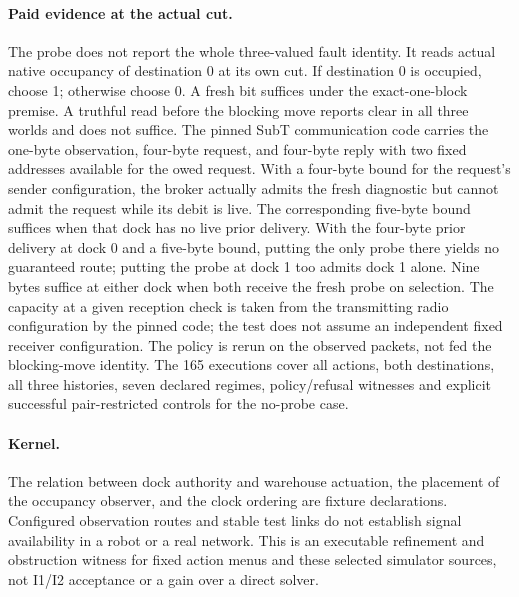 \documentclass{article}
\begin{document}
\paragraph{Paid evidence at the actual cut.}
The probe does not report the whole three-valued fault identity.
It reads actual native occupancy of destination 0 at its own cut.
If destination 0 is occupied, choose 1; otherwise choose 0.
A fresh bit suffices under the exact-one-block premise. A truthful
read before the blocking move reports clear in all three worlds
and does not suffice. The pinned SubT communication code carries
the one-byte observation, four-byte request, and four-byte reply
with two fixed addresses available for the owed request.
With a four-byte bound for the request's sender configuration,
the broker actually admits the fresh diagnostic but cannot admit
the request while its debit is live. The corresponding five-byte
bound suffices when that dock has no live prior delivery. With
the four-byte prior delivery at dock 0 and a five-byte bound,
putting the only probe there yields no guaranteed route;
putting the probe at dock 1 too admits dock 1 alone. Nine
bytes suffice at either dock when both receive the fresh probe
on selection. The capacity at a given reception check is
taken from the transmitting radio configuration by the pinned
code; the test does not assume an independent fixed receiver
configuration. The policy is rerun on the observed packets,
not fed the blocking-move identity. The 165 executions cover
all actions, both destinations, all three histories, seven
declared regimes, policy/refusal witnesses and explicit successful
pair-restricted controls for the no-probe case.

\paragraph{Kernel.}
The relation between dock authority and warehouse actuation, the
placement of the occupancy observer, and the clock ordering are
fixture declarations. Configured observation routes and stable
test links do not establish signal availability in a robot or
a real network. This is an executable refinement and obstruction
witness for fixed action menus and these selected simulator
sources, not I1/I2 acceptance or a gain over a direct solver.
\end{document}
